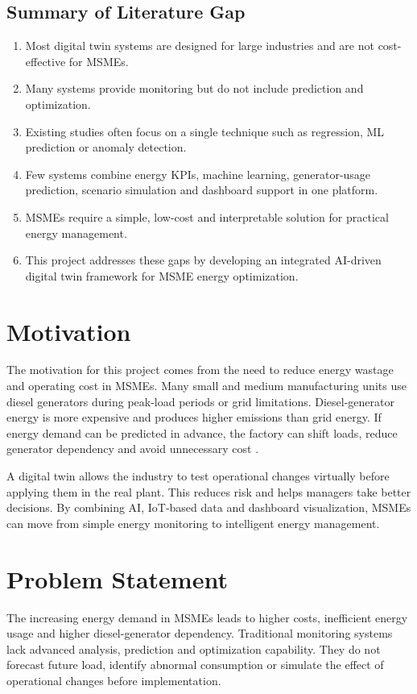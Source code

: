\subsection{Summary of Literature Gap}
\begin{enumerate}
    \item Most digital twin systems are designed for large industries and are not cost-effective for MSMEs.
    \item Many systems provide monitoring but do not include prediction and optimization.
    \item Existing studies often focus on a single technique such as regression, ML prediction or anomaly detection.
    \item Few systems combine energy KPIs, machine learning, generator-usage prediction, scenario simulation and dashboard support in one platform.
    \item MSMEs require a simple, low-cost and interpretable solution for practical energy management.
    \item This project addresses these gaps by developing an integrated AI-driven digital twin framework for MSME energy optimization.
\end{enumerate}

\section{Motivation}
The motivation for this project comes from the need to reduce energy wastage and operating cost in MSMEs. Many small and medium manufacturing units use diesel generators during peak-load periods or grid limitations. Diesel-generator energy is more expensive and produces higher emissions than grid energy. If energy demand can be predicted in advance, the factory can shift loads, reduce generator dependency and avoid unnecessary cost \cite{ref33,ref34,ref35,ref36,ref37,ref38,ref39,ref40}.

A digital twin allows the industry to test operational changes virtually before applying them in the real plant. This reduces risk and helps managers take better decisions. By combining AI, IoT-based data and dashboard visualization, MSMEs can move from simple energy monitoring to intelligent energy management.

\section{Problem Statement}
The increasing energy demand in MSMEs leads to higher costs, inefficient energy usage and higher diesel-generator dependency. Traditional monitoring systems lack advanced analysis, prediction and optimization capability. They do not forecast future load, identify abnormal consumption or simulate the effect of operational changes before implementation.

